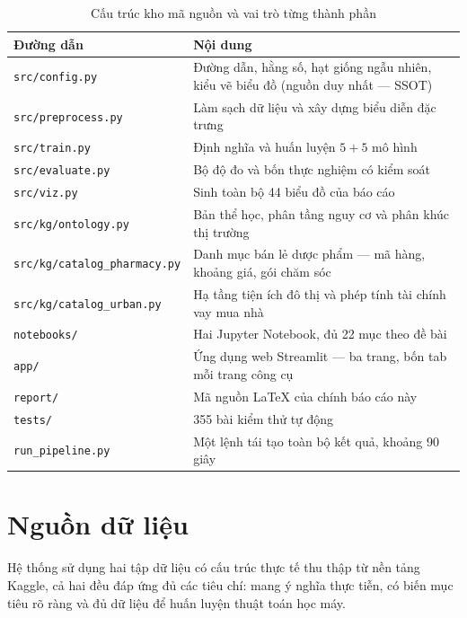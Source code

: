\begin{table}[H]
\centering
\caption{Cấu trúc kho mã nguồn và vai trò từng thành phần}
\label{tab:cautruc-kho}
\small
\begin{tabularx}{\textwidth}{@{}L{4.3cm}X@{}}
\toprule
\textbf{Đường dẫn} & \textbf{Nội dung} \\
\midrule
\texttt{src/config.py}     & Đường dẫn, hằng số, hạt giống ngẫu nhiên, kiểu vẽ biểu đồ (nguồn duy nhất --- SSOT) \\
\texttt{src/preprocess.py} & Làm sạch dữ liệu và xây dựng biểu diễn đặc trưng \\
\texttt{src/train.py}      & Định nghĩa và huấn luyện $5+5$ mô hình \\
\texttt{src/evaluate.py}   & Bộ độ đo và bốn thực nghiệm có kiểm soát \\
\texttt{src/viz.py}        & Sinh toàn bộ 44 biểu đồ của báo cáo \\
\texttt{src/kg/ontology.py} & Bản thể học, phân tầng nguy cơ và phân khúc thị trường \\
\texttt{src/kg/catalog\_pharmacy.py} & Danh mục bán lẻ dược phẩm --- mã hàng, khoảng giá, gói chăm sóc \\
\texttt{src/kg/catalog\_urban.py}    & Hạ tầng tiện ích đô thị và phép tính tài chính vay mua nhà \\
\texttt{notebooks/}        & Hai Jupyter Notebook, đủ 22 mục theo đề bài \\
\texttt{app/}              & Ứng dụng web Streamlit --- ba trang, bốn tab mỗi trang công cụ \\
\texttt{report/}           & Mã nguồn \LaTeX{} của chính báo cáo này \\
\texttt{tests/}            & 355 bài kiểm thử tự động \\
\texttt{run\_pipeline.py}  & Một lệnh tái tạo toàn bộ kết quả, khoảng 90 giây \\
\bottomrule
\end{tabularx}
\end{table}

\section{Nguồn dữ liệu}
\label{sec:nguondulieu}

Hệ thống sử dụng hai tập dữ liệu có cấu trúc thực tế thu thập từ nền tảng
Kaggle, cả hai đều đáp ứng đủ các tiêu chí: mang ý nghĩa thực tiễn, có biến mục
tiêu rõ ràng và đủ dữ liệu để huấn luyện thuật toán học máy.

